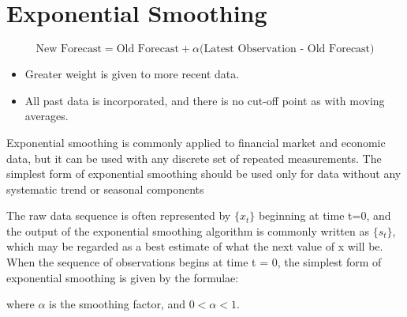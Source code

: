 \section{Exponential Smoothing}

\[
\mbox{New Forecast} = \mbox{Old Forecast} + \alpha \mbox{(Latest Observation - Old Forecast)}
\]

\begin{itemize}
\item Greater weight is given to more recent data.
\item All past data is incorporated, and there is no cut-off point as with moving averages.
\end{itemize}


Exponential smoothing is commonly applied to financial market and economic data, but it can be used with any discrete 
set of repeated measurements. The simplest form of exponential smoothing should be used only for data without any 
systematic trend or seasonal components
 
The raw data sequence is often represented by $\{x_t\}$ beginning at time t=0, and the output of the exponential 
smoothing algorithm is commonly written as $\{s_t\}$, which may be regarded as a best estimate of what the next value of 
x will be. When the sequence of observations begins at time t = 0, the simplest form of exponential smoothing is given 
by the formulae:
 

where $\alpha$ is the smoothing factor, and $0 < \alpha < 1 $.



